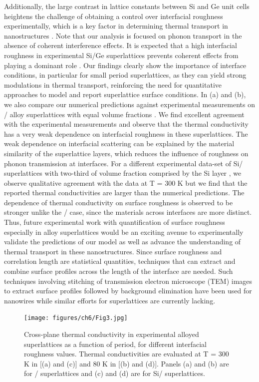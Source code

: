 Additionally, the large contrast in lattice constants between Si and Ge unit cells heightens the challenge of obtaining a control over interfacial roughness experimentally, which is a key factor in determining thermal transport in nanostructures \cite{RN396}. Note that our analysis is focused on phonon transport in the absence of coherent interference effects. It is expected that a high interfacial roughness in experimental Si/Ge superlattices prevents coherent effects from playing a dominant role \cite{RN544}. Our findings clearly show the importance of interface conditions, in particular for small period superlattices, as they can yield strong modulations in thermal transport, reinforcing the need for quantitative approaches to model and report superlattice surface conditions. In (a) and (b), we also compare our numerical predictions against experimental measurements on / alloy superlattices with equal volume fractions \cite{RN361}. We find excellent agreement with the experimental measurements and observe that the thermal conductivity has a very weak dependence on interfacial roughness in these superlattices. The weak dependence on interfacial scattering can be explained by the material similarity of the superlattice layers, which reduces the influence of roughness on phonon transmission at interfaces. For a different experimental data-set of Si/ superlattices with two-third of volume fraction comprised by the Si layer \cite{RN361}, we observe qualitative agreement with the data at \gls{T} = 300 K but we find that the reported thermal conductivities are larger than the numerical predictions. The dependence of thermal conductivity on surface roughness is observed to be stronger unlike the / case, since the materials across interfaces are more distinct. Thus, future experimental work with quantification of surface roughness especially in alloy superlattices would be an exciting avenue to experimentally validate the predictions of our model as well as advance the understanding of thermal transport in these nanostructures. Since surface roughness and correlation length are statistical quantities, techniques that can extract and combine surface profiles across the length of the interface are needed. Such techniques involving stitching of transmission electron microscope (TEM) images to extract surface profiles followed by background elimination \cite{RN131} have been used for nanowires while similar efforts for superlattices are currently lacking. 
\begin{figure}[hbtp]
  \centering \texttt{[image: figures/ch6/Fig3.jpg]}
  \caption{Cross-plane thermal conductivity in experimental alloyed superlattices as a function of period, for different interfacial roughness values. Thermal conductivities are evaluated at \gls{T} = 300 K in [(a) and (c)] and 80 K in [(b) and (d)]. Panels (a) and (b) are for / superlattices and (c) and (d) are for Si/ superlattices.}
  \label{fig:ch6-3}
\end{figure}

